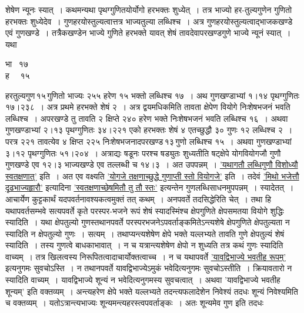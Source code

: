 \documentclass[11pt, openany]{book}
\begin{document}
\newpage

\begin{sloppypar}
\noindent शेषेण न्यूनः स्यात्~। कथमन्यथा पृथग्गुणितयोर्योगो हरभक्तः शुध्येत्~। तत्र भाज्यो हर-तुल्यगुणेन गुणितो हरभक्तः शुध्येदेव~। गुणहरयोस्तुल्यत्वात्तत्र भाज्यतुल्या लब्धिश्च~। अत्र गुणहरयोस्तुल्यत्वाद्भाजकखण्डे एवं गुणखण्डे~। तत्रैकखण्डेन भाज्ये गुणिते हरभक्ते यावत् शेषं तावदेवापरखण्डगुणे भाज्ये न्यूनं स्यात्~। यथा\textendash 
\vspace{-1mm}

\begin{center}
भा ~१७ \\
ह ~~१५
\end{center}
\vspace{-1mm}

\noindent हरतुल्यगुण\textendash \,१५\textendash \,गुणितो भाज्यः २५५ हरेण १५ भक्तो लब्धिश्च १७~। अथ गुणखण्डाभ्यां १।१४ पृथग्गुणितः १७।२३८~। अत्र प्रथमे हरभक्ते शेषं २~। अत्र द्वयमधिकमिति तावता क्षेपेण वियोगे निःशेषभजनं भवति लब्धिश्च~। अपरखण्डे तु तावति २ क्षिप्ते २४० हरेण भक्ते निःशेषभजनं भवति लब्धिश्च १६~। अथवा गुणखण्डाभ्यां २।१३ पृथग्गुणितः ३४।२२१ एको हरभक्तः शेषं ४ एतच्छुद्धौ ३० गुणः १२ लब्धिश्च २~। परत्र २२१ तावत्येव ४ क्षिप्त २२५ निःशेषभजनादपरखण्ड\textendash \,१३\textendash \,गुणो लब्धिश्च १५~। अथवा गुणखण्डाभ्यां ३।१२ पृथग्गुणितः ५१।२०४~। अत्राद्यः षडूनः परश्च षड्युतः शुध्यतीति षट्क्षेपे योगवियोगजौ गुणौ गुणखण्डे एव १२।३ भाज्यखण्डे एव तल्लब्धी च १४।३~। अत उपपन्नम्~। \hyperref[5.52]{'यथागतौ लब्धिगुणौ विशोध्यौ स्वतक्षणात्'} इति~। अत एव वक्ष्यति \hyperref[5.54]{'योगजे तक्षणाच्छुद्धे गुणाप्ती स्तो वियोगजे'} इति~। तदेवं \hyperref[5.51]{'मिथो भजेत्तौ दृढभाज्यहृारौ'} इत्यादिना \hyperref[5.52]{'स्वतक्षणाच्छेषमितौ तु तौ स्तः'} इत्यन्तेन गुणलब्धिसाधनमुपपन्नम्~। स्यादेतत्~। आचार्येण कुट्टकार्थं यदपवर्तनावश्यकत्वमुक्तं तत् कथम्~। अनपवर्ते तदसिद्धेरिति चेत्~। तथा हि यथापवर्तसम्भवे सत्यपवर्ते कृते परस्पर-भजने रूपं शेषं स्यादस्मिंश्च क्षेपगुणिते क्षेपसमतया वियोगे शुद्धिः स्यादिति~। यथा क्षेपतुल्यो गुणस्तथानपवर्ते परस्परभजनेऽपवर्ताङ्कमितेऽन्त्यशेषे क्षेपगुणिते क्षेपतुल्यता न स्यादिति न क्षेपतुल्यो गुणः~। सत्यम्~। तथाप्यन्त्यशेषेण क्षेपे भक्ते यल्लभ्यते तावति गुणे क्षेपतुल्यं शेषं स्यादिति~। तस्य गुणत्वे बाधकाभावात्~। न च यत्रान्त्यशेषेण क्षेपो न शुध्यति तत्र कथं गुणः स्यादिति वाच्यम्~। तत्र खिलत्वस्य निरूपितत्वादाचार्योक्तत्वाच्च~। न च यथापवर्ते \hyperref[5.51]{'यावद्विभाज्ये भवतीह रूपम्'} इत्यनुगमः सुवचोऽस्ति~। न तथानपवर्ते यावद्विभाज्येऽमुकं भवेदित्यनुगमः सुवचोऽस्तीति~। क्रियावतारो न स्यादिति वाच्यम्~। यावद्विभाज्ये शून्यं न भवेदित्यनुगमस्य सुवचत्वात्~। अथवा 'यावद्विभाज्ये भवतीह शून्यम्' इति वक्तव्यम्~। अन्त्यहरेण क्षेपे भक्ते यल्लभ्यते तदन्त्यफलादेशेन निवेश्यं तदधः शून्यं निवेश्यमिति च वक्तव्यम्~। यतोऽत्रान्त्यभाज्यः शून्यमन्त्यहरस्त्वपवर्ताङ्कः~। अतः शून्यमेव गुण इति तदधः
\end{sloppypar}
\end{document}
